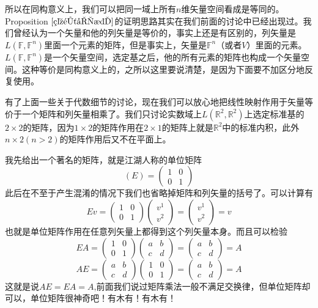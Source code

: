 \documentclass[11pt,a4paper,openany]{book}%
\theoremstyle{plain}%
\newcommand{\pref}[1]{{\rm Proposition} $\ref{#1}$}
\begin{document}
所以在同构意义上，我们可以把同一域上所有$n$维矢量空间看成是等同的。\pref{空间同构}的证明思路其实在我们前面的讨论中已经出现过。我们曾经认为一个矢量和他的列矢量是等价的，事实上还是有区别的，列矢量是$L(\mathbb{F},\mathbb{F}^n)$里面一个元素的矩阵，但是事实上，矢量是$\mathbb{F}^n$（或者$V$）里面的元素。$L(\mathbb{F},\mathbb{F}^n)$是一个矢量空间，选定基之后，他的所有元素的矩阵也构成一个矢量空间。这种等价是同构意义上的，之所以这里要说清楚，是因为下面要不加区分地反复使用。

有了上面一些关于代数细节的讨论，现在我们可以放心地把线性映射作用于矢量等价于一个矩阵和列矢量相乘了。我们只讨论实数域上$L(\mathbb{R}^2,\mathbb{R}^2)$上选定标准基的$2\times 2$的矩阵，因为$1\times 2$的矩阵作用在$2\times 1$的矩阵上就是$\mathbb{R}^2$中的标准内积，此外$n\times 2$$(n>2)$的矩阵作用后又不在平面上。

我先给出一个著名的矩阵，就是江湖人称的单位矩阵
\[
(E)=\begin{pmatrix}
1&0\\
0&1
\end{pmatrix}
\]
此后在不至于产生混淆的情况下我们也省略掉矩阵和列矢量的括号了。可以计算有
\[
Ev=\begin{pmatrix}
1&0\\
0&1
\end{pmatrix}
\begin{pmatrix}
v^1\\
v^2
\end{pmatrix}
=
\begin{pmatrix}
v^1\\
v^2
\end{pmatrix}
=v
\]
也就是单位矩阵作用在任意列矢量上都得到这个列矢量本身。而且可以检验
\[
EA=\begin{pmatrix}
1&0\\
0&1
\end{pmatrix}
\begin{pmatrix}
a&b\\
c&d
\end{pmatrix}
=
\begin{pmatrix}
a&b\\
c&d
\end{pmatrix}
=A
\]
\[
AE=
\begin{pmatrix}
a&b\\
c&d
\end{pmatrix}
\begin{pmatrix}
1&0\\
0&1
\end{pmatrix}
=
\begin{pmatrix}
a&b\\
c&d
\end{pmatrix}
=A
\]
这就是说$AE=EA=A$,前面我们说过矩阵乘法一般不满足交换律，但单位矩阵却可以，单位矩阵很神奇吧！有木有！有木有！
\end{document}
